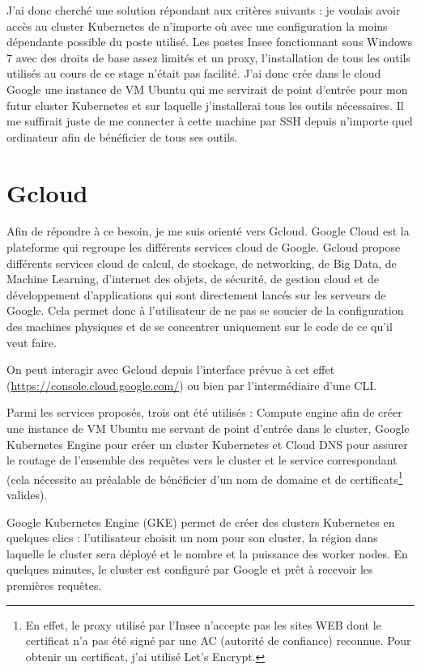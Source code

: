 \documentclass[11pt,fleqn]{book} %
\begin{document}
J'ai donc cherché une solution répondant aux critères suivants : je voulais avoir accès au cluster Kubernetes de n'importe où avec une configuration la moins dépendante possible du poste utilisé. Les postes Insee fonctionnant sous Windows 7 avec des droits de base assez limités et un proxy, l'installation de tous les outils utilisés au cours de ce stage n'était pas facilité. J'ai donc crée dans le cloud Google une instance de VM Ubuntu qui me servirait de point d'entrée pour mon futur cluster Kubernetes et sur laquelle j'installerai tous les outils nécessaires. Il me suffirait juste de me connecter à cette machine par SSH depuis n'importe quel ordinateur afin de bénéficier de tous ses outils.\newline


\section*{Gcloud}
Afin de répondre à ce besoin, je me suis orienté vers Gcloud. Google Cloud est la plateforme qui regroupe les différents services cloud de Google. Gcloud propose différents services cloud de calcul, de stockage, de networking, de Big Data, de Machine Learning, d’internet des objets, de sécurité, de gestion cloud et de développement d’applications qui sont directement lancés sur les serveurs de Google. Cela permet donc à l'utilisateur de ne pas se soucier de la configuration des machines physiques et de se concentrer uniquement sur le code de ce qu'il veut faire.\newline

On peut interagir avec Gcloud depuis l'interface prévue à cet effet  (\url{https://console.cloud.google.com/}) ou bien par l'intermédiaire d'une CLI.\newline

Parmi les services proposés, trois ont été utilisés : Compute engine afin de créer une instance de VM Ubuntu me servant de point d'entrée dans le cluster, Google Kubernetes Engine pour créer un cluster Kubernetes et Cloud DNS pour assurer le routage de l'ensemble des requêtes vers le cluster et le service correspondant (cela nécessite au préalable de bénéficier d'un nom de domaine et de certificats\footnote{En effet, le proxy utilisé par l'Insee n'accepte pas les sites WEB dont le certificat n'a pas été signé par une AC (autorité de confiance) reconnue. Pour obtenir un certificat, j'ai utilisé Let's Encrypt.} valides).\newline

Google Kubernetes Engine (GKE) permet de créer des clusters Kubernetes en quelques clics : l'utilisateur choisit un nom pour son cluster, la région dans laquelle le cluster sera déployé et le nombre et la puissance des worker nodes. En quelques minutes, le cluster est configuré par Google et prêt à recevoir les premières requêtes.\newline
\end{document}
